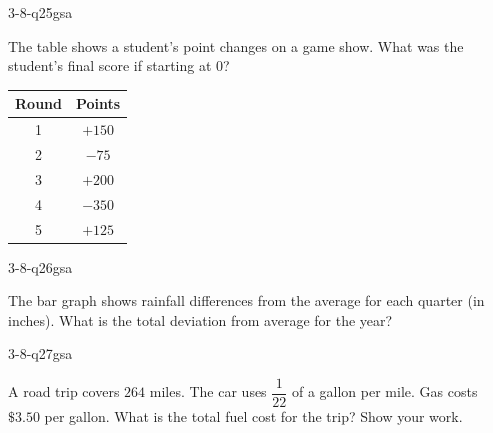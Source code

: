 \begin{practiceQuestion}{3-8-q25}{gsa}
\begin{questionText}
The table shows a student's point changes on a game show. What was the student's final score if starting at $0$?

\begin{center}
\begin{tabular}{|c|c|}
\hline
\textbf{Round} & \textbf{Points} \\
\hline
1 & $+150$ \\ \hline
2 & $-75$ \\ \hline
3 & $+200$ \\ \hline
4 & $-350$ \\ \hline
5 & $+125$ \\ \hline
\end{tabular}
\end{center}
\end{questionText}
\end{practiceQuestion}

\begin{practiceQuestion}{3-8-q26}{gsa}
\begin{questionText}
The bar graph shows rainfall differences from the average for each quarter (in inches). What is the total deviation from average for the year?

\begin{center}
\end{center}
\end{questionText}
\end{practiceQuestion}

\begin{practiceQuestion}{3-8-q27}{gsa}
\begin{questionText}
A road trip covers $264$ miles. The car uses $\dfrac{1}{22}$ of a gallon per mile. Gas costs $\$3.50$ per gallon. What is the total fuel cost for the trip? Show your work.
\end{questionText}
\end{practiceQuestion}
